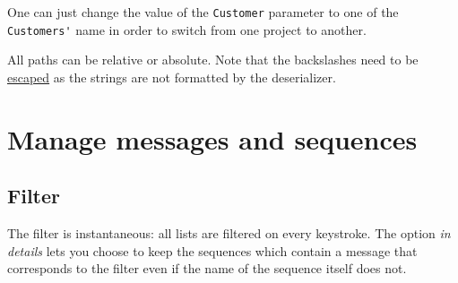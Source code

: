 \documentclass[11pt]{refart}
\newcommand{\screenshot}[3]{%
	\subfigure[#2]{%
		\texttt{[image: \#1]}%
		\label{#3}%
	}
}
\newcommand*{\textAtt}[1]{\attention\underline{#1}}
\begin{document}
One can just change the value of the \verb+Customer+ parameter to one of the \verb+Customers'+ name in order to switch from one project to another.

All paths can be relative or absolute.
Note that the backslashes need to be \textAtt{escaped} as the strings are not formatted by the deserializer.

\section{Manage messages and sequences}

\subsection{Filter}
\label{sec:filterBar}


The filter is instantaneous: all lists are filtered on every keystroke.
The option \emph{in details} lets you choose to keep the sequences which contain a message that corresponds to the filter even if the name of the sequence itself does not.
\end{document}

